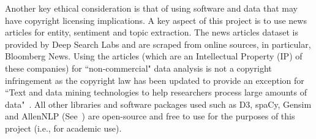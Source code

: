 Another key ethical consideration is that of using software and data that may have copyright licensing implications. A key aspect of this project is to use news articles for entity, sentiment and topic extraction. The news articles dataset is provided by Deep Search Labs and are scraped from online sources, in particular, Bloomberg News. Using the articles (which are an Intellectual Property (IP) of these companies) for ``non-commercial" data analysis is not a copyright infringement as the copyright law has been updated to provide an exception for ``Text and data mining technologies to help researchers process large amounts of data"~\cite{exceptions_to_copyright}. All other libraries and software packages used such as D3, spaCy, Gensim and AllenNLP (See~) are open-source and free to use for the purposes of this project (i.e., for academic use).